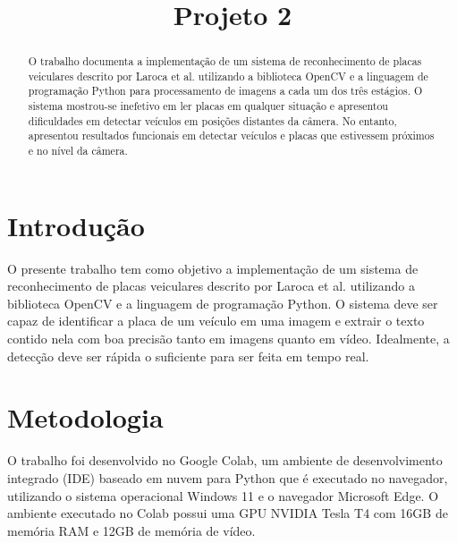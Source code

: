 \documentclass[conference]{IEEEtran}
\begin{document}
\title{Projeto 2}

\author{
}

\maketitle

\begin{abstract}
O trabalho documenta a implementação de um sistema de reconhecimento de placas veiculares descrito por Laroca et al. \cite{b1} utilizando a biblioteca OpenCV e a linguagem de programação Python para processamento de imagens a cada um dos três estágios.
O sistema mostrou-se inefetivo em ler placas em qualquer situação e apresentou dificuldades em detectar veículos em posições distantes da câmera. No entanto, apresentou resultados funcionais em detectar veículos e placas que estivessem próximos e no nível da câmera.
\end{abstract}

\section{Introdução}
\label{sec:introducao}
O presente trabalho tem como objetivo a implementação de um sistema de reconhecimento de placas veiculares descrito por Laroca et al. \cite{b1} utilizando a biblioteca OpenCV e a linguagem de programação Python.
O sistema deve ser capaz de identificar a placa de um veículo em uma imagem e extrair o texto contido nela com boa precisão tanto em imagens quanto em vídeo. Idealmente, a detecção deve ser rápida o suficiente para ser feita em tempo real.

\section{Metodologia}
\label{sec:metodologia}
O trabalho foi desenvolvido no Google Colab, um ambiente de desenvolvimento integrado (IDE) baseado em nuvem para Python que é executado no navegador, utilizando o sistema operacional Windows 11 e o navegador Microsoft Edge.
O ambiente executado no Colab possui uma GPU NVIDIA Tesla T4 com 16GB de memória RAM e 12GB de memória de vídeo.
\end{document}
